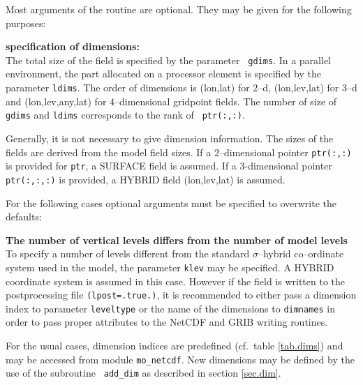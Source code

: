 Most arguments of the routine are optional. They may be given for the
following purposes:
\begin{description}
\item{\bf specification of dimensions:}\\
  The total size of the field is specified by the parameter {\tt
  gdims}. In a parallel environment, the part allocated on a processor
  element is specified by the parameter {\tt ldims}. The order of
  dimensions is (lon,lat) for 2--d, (lon,lev,lat) for 3--d and
  (lon,lev,any,lat) for 4--dimensional gridpoint fields. The number of
  size of {\tt gdims} and {\tt ldims} corresponds to the rank of {\tt
  ptr(:,:)}.

  Generally, it is not necessary to give dimension information. The
  sizes of the 
  fields are derived from the model field sizes.  If a 2--dimensional
  pointer {\tt ptr(:,:)} is provided for {\tt ptr}, a SURFACE field is
  assumed. If a 3-dimensional pointer {\tt ptr(:,:,:)} is provided, a
  HYBRID field (lon,lev,lat) is assumed.

  For the following cases optional arguments must be specified to
  overwrite the defaults:
  \begin{description}
  \item{\bf The number of vertical levels differs from the number of
  model levels}\\

    To specify a number of levels different from the standard
    $\sigma$--hybrid co--ordinate system used in the model, the
    parameter {\tt klev} 
    may be specified. A HYBRID coordinate system is assumed in this
    case. However if the field is written to the postprocessing file
    {\tt (lpost=.true.)}, it is recommended to either pass a dimension
    index to parameter {\tt leveltype} or the name of the dimensions
    to {\tt dimnames} in order to pass proper attributes to the
    NetCDF and GRIB writing routines.

    For the usual cases, dimension indices are predefined (cf.~table
    \ref{tab.dims}) and may be accessed from module {\tt mo\_netcdf}.
    New dimensions may be defined by the use of the subroutine {\tt
    add\_dim} as described in section \ref{sec.dim}.


\end{description}
\end{description}
